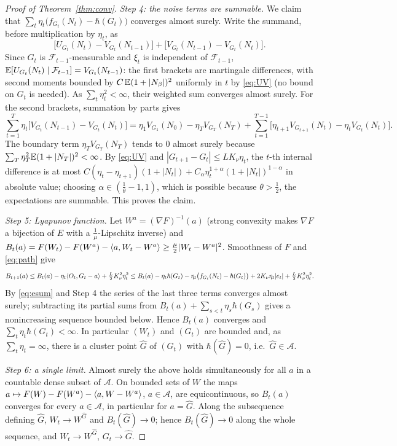 \begin{proof}[Proof of Theorem~\ref{thm:conv}]
\emph{Step 4: the noise terms are summable.} We claim that $\sum_t\eta_t\big(f_{G_t}(N_t)-\hbar(G_t)\big)$ converges almost
surely. Write the summand, before multiplication by $\eta_t$, as
\[
\big[U_{G_t}(N_t)-V_{G_t}(N_{t-1})\big]+\big[V_{G_t}(N_{t-1})-V_{G_t}(N_t)\big].
\]
Since $G_t$ is $\mathcal F_{t-1}$-measurable and $\xi_t$ is independent of $\mathcal F_{t-1}$,
$\mathbb{E}[U_{G_t}(N_t)\mid\mathcal F_{t-1}]=V_{G_t}(N_{t-1})$: the first brackets are martingale differences, with second
moments bounded by $C\,\mathbb{E}(1+|N_\beta|)^2$ uniformly in $t$ by \eqref{eq:UV} (no bound on $G_t$ is needed). As
$\sum_t\eta_t^2<\infty$, their weighted sum converges almost surely. For the second brackets, summation by parts gives
\[
\sum_{t=1}^T\eta_t\big[V_{G_t}(N_{t-1})-V_{G_t}(N_t)\big]=\eta_1V_{G_1}(N_0)-\eta_TV_{G_T}(N_T)
+\sum_{t=1}^{T-1}\big[\eta_{t+1}V_{G_{t+1}}(N_t)-\eta_tV_{G_t}(N_t)\big].
\]
The boundary term $\eta_TV_{G_T}(N_T)$ tends to $0$ almost surely because $\sum_T\eta_T^2\mathbb{E}(1+|N_T|)^2<\infty$. By
\eqref{eq:UV} and $|G_{t+1}-G_t|\le LK_\nu\eta_t$, the $t$-th internal difference is at most
$C(\eta_t-\eta_{t+1})(1+|N_t|)+C_\alpha\eta_t^{1+\alpha}(1+|N_t|)^{1-\alpha}$ in absolute value; choosing
$\alpha\in(\frac1\theta-1,1)$, which is possible because $\theta>\frac12$, the expectations are summable. This proves the
claim.

\emph{Step 5: Lyapunov function.} Let $W^a=(\nabla F)^{-1}(a)$ (strong convexity makes $\nabla F$ a bijection of $E$ with
a $\frac1\mu$-Lipschitz inverse) and $B_t(a)=F(W_t)-F(W^a)-\langle a, W_t-W^a\rangle\ge\frac\mu2|W_t-W^a|^2$. Smoothness of $F$ and
\eqref{eq:path} give
\[
B_{t+1}(a)\le B_t(a)-\eta_t\langle O_t, G_t-a\rangle+\tfrac L2K_\nu^2\eta_t^2
\le B_t(a)-\eta_t\hbar(G_t)-\eta_t\big(f_{G_t}(N_t)-\hbar(G_t)\big)+2K_\nu\eta_t|e_t|+\tfrac L2K_\nu^2\eta_t^2 .
\]
By \eqref{eq:esum} and Step 4 the series of the last three terms converges almost surely; subtracting its partial sums
from $B_t(a)+\sum_{s<t}\eta_s\hbar(G_s)$ gives a nonincreasing sequence bounded below. Hence $B_t(a)$ converges and
$\sum_t\eta_t\hbar(G_t)<\infty$. In particular $(W_t)$ and $(G_t)$ are bounded and, as $\sum_t\eta_t=\infty$, there is a
cluster point $\widehat G$ of $(G_t)$ with $\hbar(\widehat G)=0$, i.e.\ $\widehat G\in\mathcal A$.

\emph{Step 6: a single limit.} Almost surely the above holds simultaneously for all $a$ in a countable dense subset of
$\mathcal A$. On bounded sets of $W$ the maps $a\mapsto F(W)-F(W^a)-\langle a, W-W^a\rangle$, $a\in\mathcal A$, are equicontinuous,
so $B_t(a)$ converges for every $a\in\mathcal A$, in particular for $a=\widehat G$. Along the subsequence defining
$\widehat G$, $W_t\to W^{\widehat G}$ and $B_t(\widehat G)\to0$; hence $B_t(\widehat G)\to0$ along the whole sequence, and
$W_t\to W^{\widehat G}$, $G_t\to\widehat G$.
\end{proof}
